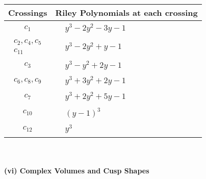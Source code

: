 \documentclass[1p]{elsarticle_modified}
\theoremstyle{definition}
\begin{document}
\begin{tabular}{m{50pt}|m{274pt}}
Crossings & \hspace{64pt}Riley Polynomials at each crossing \\
\hline $$\begin{aligned}c_{1}\end{aligned}$$&$\begin{aligned}
&y^3-2 y^2-3 y-1
\end{aligned}$\\
\hline $$\begin{aligned}c_{2},c_{4},c_{5}\\c_{11}\end{aligned}$$&$\begin{aligned}
&y^3-2 y^2+y-1
\end{aligned}$\\
\hline $$\begin{aligned}c_{3}\end{aligned}$$&$\begin{aligned}
&y^3- y^2+2 y-1
\end{aligned}$\\
\hline $$\begin{aligned}c_{6},c_{8},c_{9}\end{aligned}$$&$\begin{aligned}
&y^3+3 y^2+2 y-1
\end{aligned}$\\
\hline $$\begin{aligned}c_{7}\end{aligned}$$&$\begin{aligned}
&y^3+2 y^2+5 y-1
\end{aligned}$\\
\hline $$\begin{aligned}c_{10}\end{aligned}$$&$\begin{aligned}
&(y-1)^3
\end{aligned}$\\
\hline $$\begin{aligned}c_{12}\end{aligned}$$&$\begin{aligned}
&y^3
\end{aligned}$\\
\hline
\end{tabular}\\~\\
\newpage\flushleft \textbf{(vi) Complex Volumes and Cusp Shapes}
\end{document}
